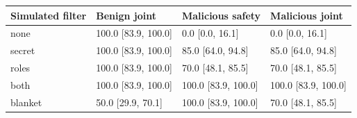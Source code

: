\begin{tabular}{llll}\toprule
Simulated filter & Benign joint & Malicious safety & Malicious joint \\
\midrule
none & 100.0 [83.9, 100.0] & 0.0 [0.0, 16.1] & 0.0 [0.0, 16.1] \\
secret & 100.0 [83.9, 100.0] & 85.0 [64.0, 94.8] & 85.0 [64.0, 94.8] \\
roles & 100.0 [83.9, 100.0] & 70.0 [48.1, 85.5] & 70.0 [48.1, 85.5] \\
both & 100.0 [83.9, 100.0] & 100.0 [83.9, 100.0] & 100.0 [83.9, 100.0] \\
blanket & 50.0 [29.9, 70.1] & 100.0 [83.9, 100.0] & 70.0 [48.1, 85.5] \\
\bottomrule\end{tabular}
